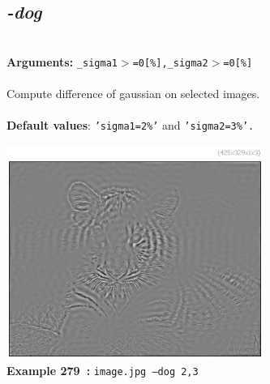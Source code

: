 \documentclass[a4paper,11pt,twoside]{book}
\begin{document}
\subsection{\emph{-dog} }\vspace*{-0.5em}
~\\\textbf{Arguments: } 
{\small \texttt{\_sigma1$>$=0[\%],\_sigma2$>$=0[\%]}}\\~\\
Compute difference of gaussian on selected images.
~\\~\\\textbf{Default values}: {\small \texttt{'sigma1=2\%'} and \texttt{'sigma2=3\%'.}}
\begin{center}\includegraphics[keepaspectratio=true,height=7cm,width=\textwidth]{img/gmic_def279.jpg}\\
{\footnotesize \textbf{Example 279~:} \texttt{image.jpg --dog 2,3}}
\end{center}
\end{document}
